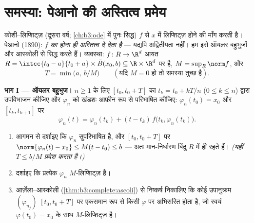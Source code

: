 \section{समस्या: पेआनो की अस्तित्व प्रमेय}

\begin{problem}[{सप्ताहांत समस्या --- लिप्शिट्ज़ के बिना $x' = f(t, x)$ के
हलों का अस्तित्व}]\label{pb:b3:complete:1}
कोशी--लिप्शिट्ज़ (दूसरा वर्ष; \cref{ch:b3:ode} में पुनः सिद्ध) $f$ से
$x$ में लिप्शिट्ज़ होने की माँग करती है। पेआनो (1890):
\emph{$f$ का  होना ही अस्तित्व दे देता है} --- यद्यपि
अद्वितीयता नहीं। हम इसे ऑयलर बहुभुजों और आस्कोली से सिद्ध करते
हैं। व्यवस्था: $f \colon R
\to \R^d$ आयत $R = \intcc{t_0 - a}{t_0
+ a}\times \bar B(x_0, b) \subseteq \R\times\R^d$ पर  है, $M =
\sup_R\norm f$, और
\[
T = \min\bigl(a,\ b/M\bigr)
\qquad (\text{यदि } M = 0 \text{ हो तो समस्या तुच्छ है}).
\]

\medskip
\noindent\textbf{भाग I --- ऑयलर बहुभुज।} $n \geq 1$ के लिए $[t_0, t_0 + T]$ का
$t_k = t_0 + kT/n$ ($0 \leq k
\leq n$) द्वारा उपविभाजन कीजिए और $\varphi_n$ को खंडशः आफ़ीन रूप
से परिभाषित कीजिए: $\varphi_n(t_0) = x_0$ और $[t_k, t_{k+1}]$ पर
\[
\varphi_n(t) = \varphi_n(t_k) + (t -
t_k)\,f\bigl(t_k, \varphi_n(t_k)\bigr).
\]
\begin{enumerate}
  \item आगमन से दर्शाइए कि $\varphi_n$ सुपरिभाषित है, और $[t_0, t_0 + T]$ पर
        $\norm{\varphi_n(t) - x_0} \leq M(t - t_0) \leq b$ --- अतः मान-निर्धारण बिंदु $R$ में ही रहते हैं।
        \emph{(यहीं $T \leq b/M$ प्रवेश करता है।)}
  \item दर्शाइए कि प्रत्येक $\varphi_n$ $M$-लिप्शिट्ज़ है।
  \item आर्ज़ेला--आस्कोली (\cref{thm:b3:complete:ascoli}) से निष्कर्ष निकालिए कि कोई
        उपानुक्रम $(\varphi_{n_j})$ $[t_0, t_0 +
        T]$ पर एकसमान रूप से किसी $\varphi$ पर
        अभिसरित होता है, जो स्वयं $\varphi(t_0) = x_0$ के साथ $M$-लिप्शिट्ज़
        है।
\end{enumerate}


\end{problem}
